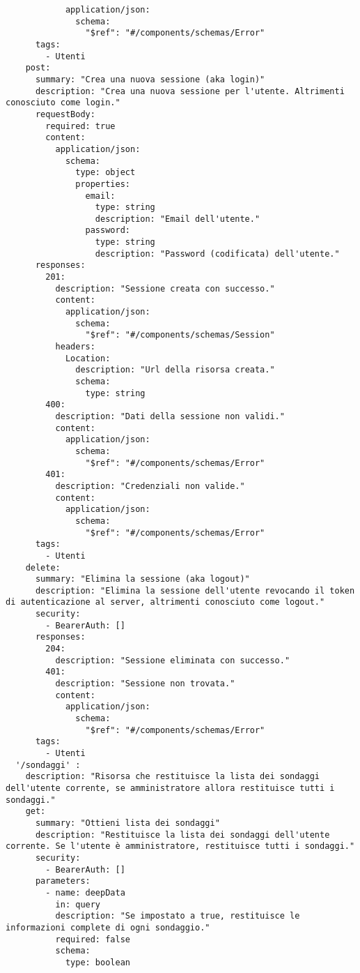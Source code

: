 \begin{verbatim}
            application/json:
              schema:
                "$ref": "#/components/schemas/Error"
      tags:
        - Utenti
    post: 
      summary: "Crea una nuova sessione (aka login)"
      description: "Crea una nuova sessione per l'utente. Altrimenti conosciuto come login."
      requestBody:
        required: true
        content:
          application/json:
            schema:
              type: object
              properties:
                email:
                  type: string
                  description: "Email dell'utente."
                password:
                  type: string
                  description: "Password (codificata) dell'utente."
      responses:
        201:
          description: "Sessione creata con successo."
          content:
            application/json:
              schema:
                "$ref": "#/components/schemas/Session"
          headers:
            Location: 
              description: "Url della risorsa creata."
              schema:
                type: string
        400:
          description: "Dati della sessione non validi."
          content:
            application/json:
              schema:
                "$ref": "#/components/schemas/Error"
        401:
          description: "Credenziali non valide."
          content:
            application/json:
              schema:
                "$ref": "#/components/schemas/Error"
      tags:
        - Utenti
    delete: 
      summary: "Elimina la sessione (aka logout)"
      description: "Elimina la sessione dell'utente revocando il token di autenticazione al server, altrimenti conosciuto come logout."
      security:
        - BearerAuth: []
      responses:
        204:
          description: "Sessione eliminata con successo."
        401:
          description: "Sessione non trovata."
          content:
            application/json:
              schema:
                "$ref": "#/components/schemas/Error"
      tags:
        - Utenti
  '/sondaggi' :
    description: "Risorsa che restituisce la lista dei sondaggi dell'utente corrente, se amministratore allora restituisce tutti i sondaggi."
    get: 
      summary: "Ottieni lista dei sondaggi"
      description: "Restituisce la lista dei sondaggi dell'utente corrente. Se l'utente è amministratore, restituisce tutti i sondaggi."
      security:
        - BearerAuth: []
      parameters:
        - name: deepData
          in: query
          description: "Se impostato a true, restituisce le informazioni complete di ogni sondaggio."
          required: false
          schema:
            type: boolean

\end{verbatim}
